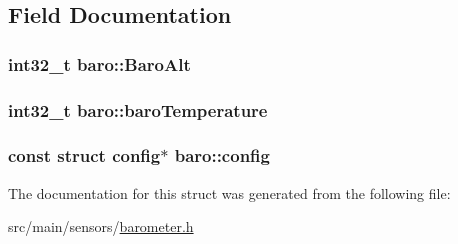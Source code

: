 \subsection{Field Documentation}
\hypertarget{structbaro_a43c7fc33ce01819c8f62b086dd1133ae}{
\subsubsection[{Baro\+Alt}]{\setlength{\rightskip}{0pt plus 5cm}int32\+\_\+t baro\+::\+Baro\+Alt}}\label{structbaro_a43c7fc33ce01819c8f62b086dd1133ae}
\hypertarget{structbaro_a7c0f0f598179c4ab8a7f4a7fc0037a8f}{
\subsubsection[{baro\+Temperature}]{\setlength{\rightskip}{0pt plus 5cm}int32\+\_\+t baro\+::baro\+Temperature}}\label{structbaro_a7c0f0f598179c4ab8a7f4a7fc0037a8f}
\hypertarget{structbaro_ae94e8bfca328f0e1bce56979f43231ad}{
\subsubsection[{config}]{\setlength{\rightskip}{0pt plus 5cm}const struct {\bf config}$\ast$ baro\+::config}}\label{structbaro_ae94e8bfca328f0e1bce56979f43231ad}


The documentation for this struct was generated from the following file\+:\begin{DoxyCompactItemize}
\item 
src/main/sensors/\hyperlink{sensors_2barometer_8h}{barometer.\+h}\end{DoxyCompactItemize}
